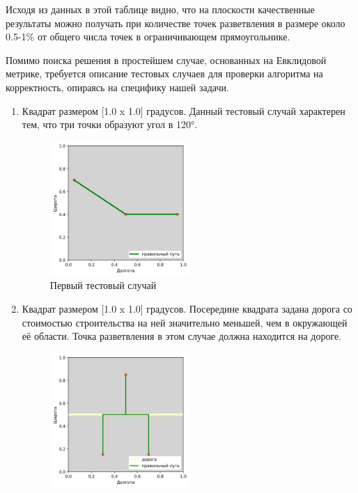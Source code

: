 Исходя из данных в этой таблице видно, что на плоскости качественные результаты можно получать при количестве точек разветвления в размере около 0.5-1\% от общего числа точек в ограничивающем прямоугольнике.
\par
Помимо поиска решения в простейшем случае, основанных на Евклидовой метрике, требуется описание тестовых случаев для проверки алгоритма на корректность, опираясь на специфику нашей задачи.
\begin{enumerate}
	\item {
		Квадрат размером [1.0 x 1.0] градусов. Данный тестовый случай характерен тем, что три точки образуют угол в 120°. 
		\begin{figure}[H]
			\includegraphics[width=0.5\textwidth]{images/4_4.png}
			\caption{Первый тестовый случай}
			\label{pic:steiner_case_1}
		\end{figure}
		\vspace{2mm}
	}
	\item {
		Квадрат размером [1.0 x 1.0] градусов. Посередине квадрата задана дорога со стоимостью строительства на ней значительно меньшей, чем в окружающей её области. Точка разветвления в этом случае должна находится на дороге. 
		\begin{figure}[H]
			\includegraphics[width=0.5\textwidth]{images/4_5.png}

\end{figure}}
\end{enumerate}

